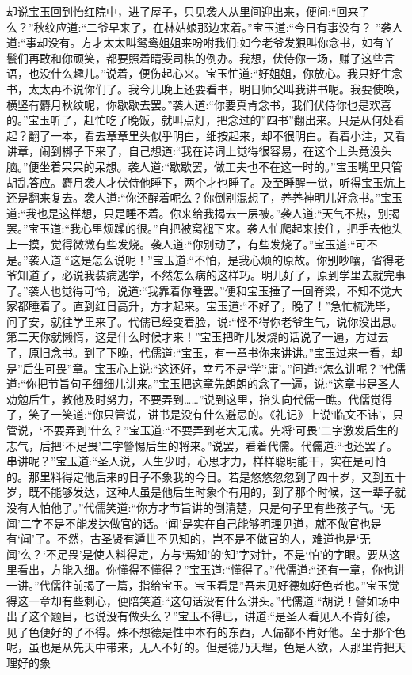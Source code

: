 \begin{parag}
    却说宝玉回到怡红院中，进了屋子，只见袭人从里间迎出来，便问:“回来了么？”秋纹应道:“二爷早来了，在林姑娘那边来着。”宝玉道:“今日有事没有？ ”袭人道:“事却没有。方才太太叫鸳鸯姐姐来吩咐我们:如今老爷发狠叫你念书，如有丫鬟们再敢和你顽笑，都要照着晴雯司棋的例办。我想，伏侍你一场，赚了这些言语，也没什么趣儿。”说着，便伤起心来。宝玉忙道:“好姐姐，你放心。我只好生念书，太太再不说你们了。我今儿晚上还要看书，明日师父叫我讲书呢。我要使唤，横竖有麝月秋纹呢，你歇歇去罢。”袭人道:“你要真肯念书，我们伏侍你也是欢喜的。”宝玉听了，赶忙吃了晚饭，就叫点灯，把念过的”四书”翻出来。只是从何处看起？翻了一本，看去章章里头似乎明白，细按起来，却不很明白。看着小注，又看讲章，闹到梆子下来了，自己想道:“我在诗词上觉得很容易，在这个上头竟没头脑。”便坐着呆呆的呆想。袭人道:“歇歇罢，做工夫也不在这一时的。”宝玉嘴里只管胡乱答应。麝月袭人才伏侍他睡下，两个才也睡了。及至睡醒一觉，听得宝玉炕上还是翻来复去。袭人道:“你还醒着呢么？你倒别混想了，养养神明儿好念书。”宝玉道:“我也是这样想，只是睡不着。你来给我揭去一层被。”袭人道:“天气不热，别揭罢。”宝玉道:“我心里烦躁的很。”自把被窝褪下来。袭人忙爬起来按住，把手去他头上一摸，觉得微微有些发烧。袭人道:“你别动了，有些发烧了。”宝玉道:“可不是。”袭人道:“这是怎么说呢！”宝玉道:“不怕，是我心烦的原故。你别吵嚷，省得老爷知道了，必说我装病逃学，不然怎么病的这样巧。明儿好了，原到学里去就完事了。”袭人也觉得可怜，说道:“我靠着你睡罢。”便和宝玉捶了一回脊梁，不知不觉大家都睡着了。直到红日高升，方才起来。宝玉道:“不好了，晚了！”急忙梳洗毕，问了安，就往学里来了。代儒已经变着脸，说:“怪不得你老爷生气，说你没出息。第二天你就懒惰，这是什么时候才来！”宝玉把昨儿发烧的话说了一遍，方过去了，原旧念书。到了下晚，代儒道:“宝玉，有一章书你来讲讲。”宝玉过来一看，却是”后生可畏”章。宝玉心上说:“这还好，幸亏不是‘学’‘庸’。”问道:“怎么讲呢？”代儒道:“你把节旨句子细细儿讲来。”宝玉把这章先朗朗的念了一遍，说:“这章书是圣人劝勉后生，教他及时努力，不要弄到……”说到这里，抬头向代儒一瞧。代儒觉得了，笑了一笑道:“你只管说，讲书是没有什么避忌的。《礼记》上说‘临文不讳’，只管说，‘不要弄到’什么？”宝玉道:“不要弄到老大无成。先将‘可畏’二字激发后生的志气，后把‘不足畏’二字警惕后生的将来。”说罢，看着代儒。代儒道:“也还罢了。串讲呢？”宝玉道:“圣人说，人生少时，心思才力，样样聪明能干，实在是可怕的。那里料得定他后来的日子不象我的今日。若是悠悠忽忽到了四十岁，又到五十岁，既不能够发达，这种人虽是他后生时象个有用的，到了那个时候，这一辈子就没有人怕他了。”代儒笑道:“你方才节旨讲的倒清楚，只是句子里有些孩子气。‘无闻’二字不是不能发达做官的话。‘闻’是实在自己能够明理见道，就不做官也是有‘闻’了。不然，古圣贤有遁世不见知的，岂不是不做官的人，难道也是‘无闻’么？‘不足畏’是使人料得定，方与‘焉知’的‘知’字对针，不是‘怕’的字眼。要从这里看出，方能入细。你懂得不懂得？”宝玉道:“懂得了。”代儒道:“还有一章，你也讲一讲。”代儒往前揭了一篇，指给宝玉。宝玉看是”吾未见好德如好色者也。”宝玉觉得这一章却有些刺心，便陪笑道:“这句话没有什么讲头。”代儒道:“胡说！譬如场中出了这个题目，也说没有做头么？”宝玉不得已，讲道:“是圣人看见人不肯好德，见了色便好的了不得。殊不想德是性中本有的东西，人偏都不肯好他。至于那个色呢，虽也是从先天中带来，无人不好的。但是德乃天理，色是人欲，人那里肯把天理好的象
\end{parag}
